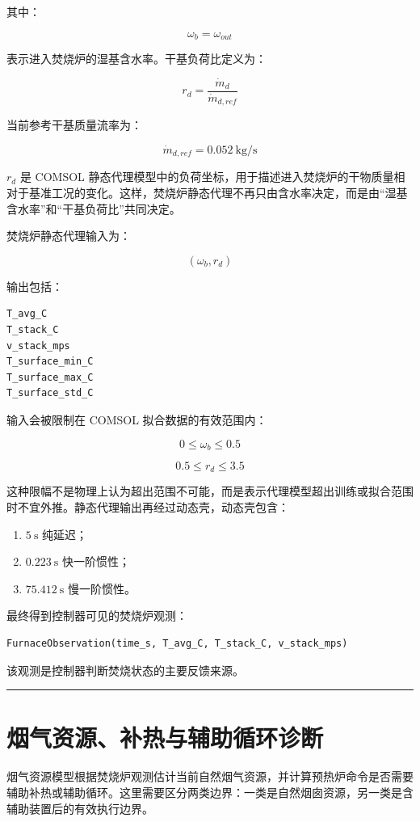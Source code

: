 \documentclass[UTF8,openany,zihao=-4,oneside]{ctexbook}
\newcommand{\manualdivider}{\par\vspace{0.6em}\noindent\textcolor{FGLine}{\rule{\linewidth}{0.7pt}}\vspace{0.6em}\par}
\begin{document}
其中：

\[
\omega_b=\omega_{out}
\]

表示进入焚烧炉的湿基含水率。干基负荷比定义为：

\[
r_d=\frac{\dot m_d}{\dot m_{d,ref}}
\]

当前参考干基质量流率为：

\[
\dot m_{d,ref}=0.052\ \mathrm{kg/s}
\]

\(r_d\) 是 COMSOL 静态代理模型中的负荷坐标，用于描述进入焚烧炉的干物质量相对于基准工况的变化。这样，焚烧炉静态代理不再只由含水率决定，而是由“湿基含水率”和“干基负荷比”共同决定。

焚烧炉静态代理输入为：

\[
(\omega_b,r_d)
\]

输出包括：

\begin{lstlisting}
T_avg_C
T_stack_C
v_stack_mps
T_surface_min_C
T_surface_max_C
T_surface_std_C
\end{lstlisting}

输入会被限制在 COMSOL 拟合数据的有效范围内：

\[
0\le\omega_b\le0.5
\]

\[
0.5\le r_d\le3.5
\]

这种限幅不是物理上认为超出范围不可能，而是表示代理模型超出训练或拟合范围时不宜外推。静态代理输出再经过动态壳，动态壳包含：

\begin{enumerate}
\item \(5\ \mathrm{s}\) 纯延迟；
\item \(0.223\ \mathrm{s}\) 快一阶惯性；
\item \(75.412\ \mathrm{s}\) 慢一阶惯性。
\end{enumerate}

最终得到控制器可见的焚烧炉观测：

\begin{lstlisting}
FurnaceObservation(time_s, T_avg_C, T_stack_C, v_stack_mps)
\end{lstlisting}

该观测是控制器判断焚烧状态的主要反馈来源。

\manualdivider

\section{烟气资源、补热与辅助循环诊断}\label{ux70dfux6c14ux8d44ux6e90ux8865ux70edux4e0eux8f85ux52a9ux5faaux73afux8bcaux65ad}

烟气资源模型根据焚烧炉观测估计当前自然烟气资源，并计算预热炉命令是否需要辅助补热或辅助循环。这里需要区分两类边界：一类是自然烟囱资源，另一类是含辅助装置后的有效执行边界。
\end{document}
